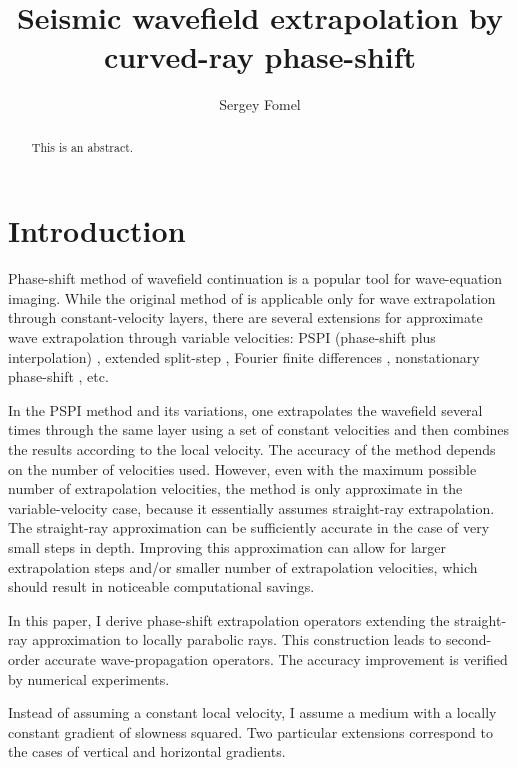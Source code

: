 \title{Seismic wavefield extrapolation by curved-ray phase-shift}
\author{Sergey Fomel}

\maketitle

\begin{abstract}
This is an abstract.
\end{abstract}

\section{Introduction}

Phase-shift method of wavefield continuation is a popular tool for
wave-equation imaging. While the original method of
\cite{GEO43-07-13421351} is applicable only for wave extrapolation through
constant-velocity layers, there are several extensions for approximate wave
extrapolation through variable velocities: PSPI (phase-shift plus
interpolation) \cite[]{GEO49-02-01240131}, extended split-step
\cite[]{GEO55-04-04100421,SEG-1992-0917}, Fourier finite differences
\cite[]{GEO59-12-18821893}, nonstationary phase-shift
\cite[]{GEO64-04-10671078}, etc.

In the PSPI method and its variations, one extrapolates the wavefield several
times through the same layer using a set of constant velocities and then
combines the results according to the local velocity. The accuracy of the
method depends on the number of velocities used. However, even with the
maximum possible number of extrapolation velocities, the method is only
approximate in the variable-velocity case, because it essentially assumes
straight-ray extrapolation. The straight-ray approximation can be sufficiently
accurate in the case of very small steps in depth. Improving this
approximation can allow for larger extrapolation steps and/or smaller number
of extrapolation velocities, which should result in noticeable computational
savings.

In this paper, I derive phase-shift extrapolation operators extending the
straight-ray approximation to locally parabolic rays. This construction leads
to second-order accurate wave-propagation operators. The accuracy improvement
is verified by numerical experiments.

Instead of assuming a constant local velocity, I assume a medium with a
locally constant gradient of slowness squared. Two particular extensions
correspond to the cases of vertical and horizontal gradients.

